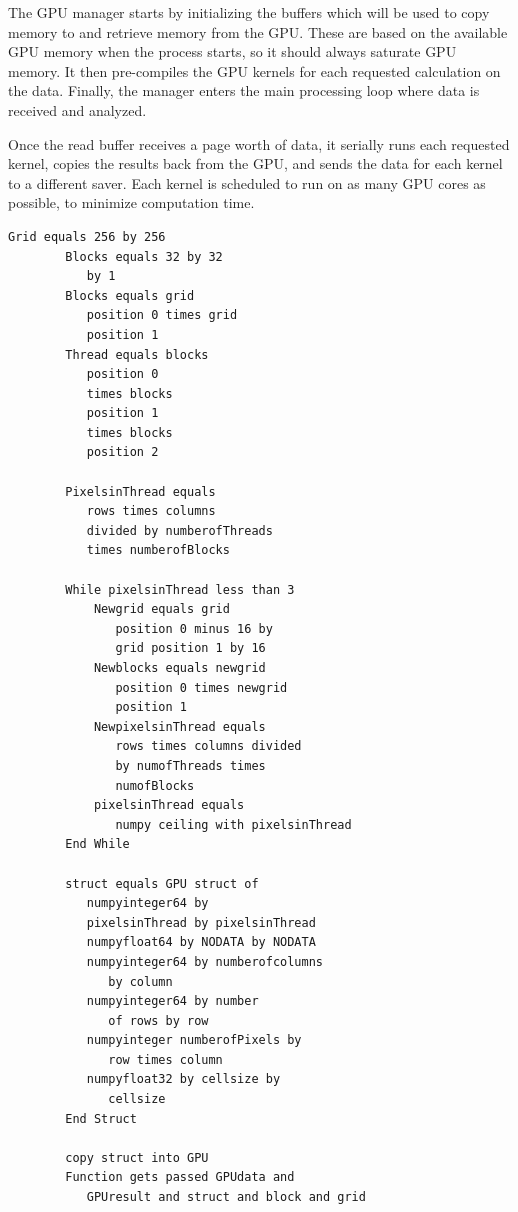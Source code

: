 \documentclass[journal]{IEEEtran}
\begin{document}
    The GPU manager starts by initializing the buffers which will be used to
    copy memory to and retrieve memory from the GPU. These are based on the
    available GPU memory when the process starts, so it should always saturate
    GPU memory. It then pre-compiles the GPU kernels for each requested
    calculation on the data. Finally, the manager enters the main processing loop
    where data is received and analyzed.

    Once the read buffer receives a page worth of data, it serially runs each
    requested kernel, copies the results back from the GPU, and sends the data
    for each kernel to a different saver. Each kernel is scheduled to run on
    as many GPU cores as possible, to minimize computation time.

\begin{Verbatim}[frame=single, gobble=8]
        Grid equals 256 by 256
        Blocks equals 32 by 32 
           by 1
        Blocks equals grid 
           position 0 times grid 
           position 1
        Thread equals blocks 
           position 0 
           times blocks 
           position 1 
           times blocks 
           position 2
      
        PixelsinThread equals 
           rows times columns 
           divided by numberofThreads 
           times numberofBlocks
	 
        While pixelsinThread less than 3
            Newgrid equals grid 
               position 0 minus 16 by 
               grid position 1 by 16
            Newblocks equals newgrid 
               position 0 times newgrid 
               position 1
            NewpixelsinThread equals 
               rows times columns divided
               by numofThreads times 
               numofBlocks
            pixelsinThread equals 
               numpy ceiling with pixelsinThread
        End While
   
        struct equals GPU struct of
           numpyinteger64 by 
           pixelsinThread by pixelsinThread
           numpyfloat64 by NODATA by NODATA
           numpyinteger64 by numberofcolumns
              by column
           numpyinteger64 by number 
              of rows by row
           numpyinteger numberofPixels by 
              row times column
           numpyfloat32 by cellsize by 
              cellsize
        End Struct

        copy struct into GPU
        Function gets passed GPUdata and 
           GPUresult and struct and block and grid
\end{Verbatim}
\end{document}
